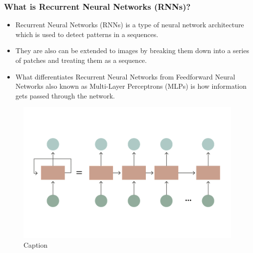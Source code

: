 \documentclass[11pt,]{beamer}
\begin{document}
\begin{frame}
    \frametitle{What is Recurrent Neural Networks (RNNs)?}
    \begin{itemize}
        \item Recurrent Neural Networks (RNNs) is a type of neural network architecture which is used to detect patterns in a sequences.
        \item They are also can be extended to images by breaking them down into a series of patches and treating them as a sequence.
        \item What differentiates Recurrent Neural Networks from Feedforward Neural Networks also known as Multi-Layer Perceptrons (MLPs) is how
information gets passed through the network.
    \end{itemize}
    \begin{figure}
        \centering
        \includegraphics[scale=0.3]{Images/Picture4.png}
        \caption{Caption}
        \label{fig:enter-label}
    \end{figure}
\end{frame}
\end{document}
